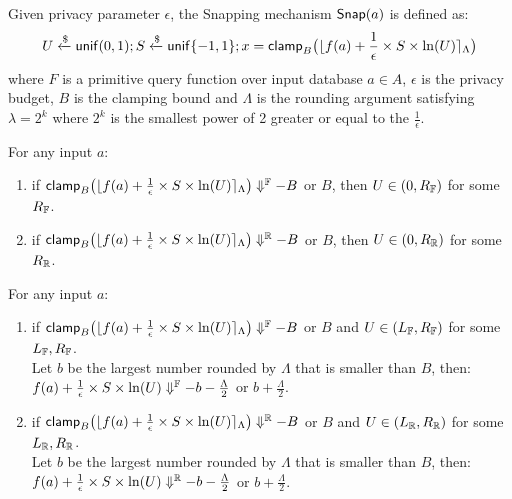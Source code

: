 \documentclass[a4paper,11pt]{article}
\begin{document}
\begin{defn}
Given privacy parameter $\epsilon$, the Snapping mechanism $\mathsf{Snap}(a)$ is defined as:
\[
	U \xleftarrow{\$} \mathsf{unif}(0,1); S \xleftarrow{\$} \mathsf{unif}\{-1, 1\};
	x = \mathsf{clamp}_B \big(
	\lfloor f(a) + \frac{1}{\epsilon} \times S \times \ln (U) \rceil_{\Lambda}
	\big)
\]
where $F$ is a primitive query function over input database $a \in A$, $\epsilon$ is the privacy budget, $B$ is the clamping bound and $\Lambda$ is the rounding argument satisfying $\lambda = 2^k$ where $2^k$ is the smallest power of 2 greater or equal to the $\frac{1}{\epsilon}$.
%
\end{defn}

\begin{lem}
[ZeroBoundL]
\label{lem:zeroboundl}
For any input $a$:
\begin{enumerate}
\item 
if 
$\mathsf{clamp}_B \big(
	\lfloor f(a) + \frac{1}{\epsilon} \times S \times \ln (U) \rceil_{\Lambda}
	\big)
	\Downarrow^{\mathbb{F}} -B$ or $B$, then $U \in (0, R_{\mathbb{F}})$ for some $R_{\mathbb{F}}$.
\item
if
$\mathsf{clamp}_B \big(
	\lfloor f(a) + \frac{1}{\epsilon} \times S \times \ln (U) \rceil_{\Lambda}
	\big)
	\Downarrow^{\mathbb{R}} -B$ or $B$, then $U \in (0, R_{\mathbb{R}})$ for some $R_{\mathbb{R}}$.
\end{enumerate}
\end{lem}

\begin{lem}
[ZeroBoundR]
\label{lem:zeroboundr}
For any input $a$:
\begin{enumerate}
\item 
if 
$\mathsf{clamp}_B \big(
	\lfloor f(a) + \frac{1}{\epsilon} \times S \times \ln (U) \rceil_{\Lambda}
	\big)
	\Downarrow^{\mathbb{F}} -B$ or $B$ and $U \in (L_{\mathbb{F}}, R_{\mathbb{F}})$ for some $L_{\mathbb{F}}, R_{\mathbb{F}}$.
	\\
	 Let $b$ be the largest number rounded by $\Lambda$ that is smaller than $B$, 
	 then:
	 \\
	$f(a) + \frac{1}{\epsilon} \times S \times \ln (U) \Downarrow^{\mathbb{F}} -b - \frac{\Lambda}{2}$ or $b + \frac{\Lambda}{2}$.
%
\item
if
$\mathsf{clamp}_B \big(
	\lfloor f(a) + \frac{1}{\epsilon} \times S \times \ln (U) \rceil_{\Lambda}
	\big)
	\Downarrow^{\mathbb{R}} -B$ or $B$ and $U \in (L_{\mathbb{R}}, R_{\mathbb{R}})$ for some $L_{\mathbb{R}}, R_{\mathbb{R}}$.
	\\
	 Let $b$ be the largest number rounded by $\Lambda$ that is smaller than $B$, 
	 then:
	 \\
	$f(a) + \frac{1}{\epsilon} \times S \times \ln (U) \Downarrow^{\mathbb{R}} -b - \frac{\Lambda}{2}$ or $b + \frac{\Lambda}{2}$.
\end{enumerate}
\end{lem}
\end{document}
